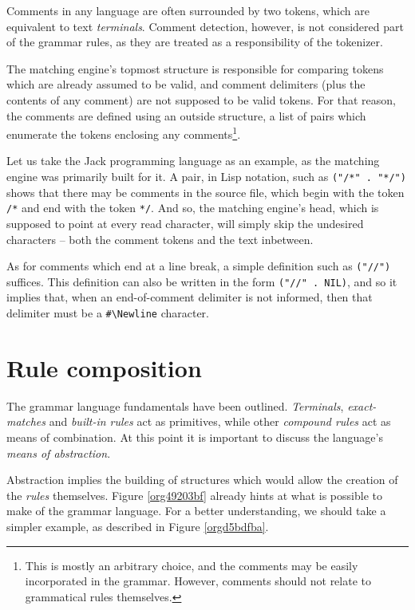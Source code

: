 \documentclass[a4paper,11pt,oneside]{article}
\begin{document}
Comments in any language are often surrounded by two tokens, which are
equivalent to text \emph{terminals}. Comment detection, however, is not
considered part of the grammar rules, as they are treated as a
responsibility of the tokenizer.

The matching engine's topmost structure is responsible for comparing
tokens which are already assumed to be valid, and comment delimiters
(plus the contents of any comment) are not supposed to be valid
tokens. For that reason, the comments are defined using an outside
structure, a list of pairs which enumerate the tokens enclosing any
comments\footnote{This is mostly an arbitrary choice, and the comments may be
easily incorporated in the grammar. However, comments should not
relate to grammatical rules themselves.}.

Let us take the Jack programming language as an example, as the
matching engine was primarily built for it. A pair, in Lisp notation,
such as \texttt{("/*" . "*/")} shows that there may be comments in the source
file, which begin with the token \texttt{/*} and end with the token \texttt{*/}. And
so, the matching engine's head, which is supposed to point at every
read character, will simply skip the undesired characters -- both the
comment tokens and the text inbetween.

As for comments which end at a line break, a simple definition such as
\texttt{("//")} suffices. This definition can also be written in the form
\texttt{("//" . NIL)}, and so it implies that, when an end-of-comment delimiter
is not informed, then that delimiter must be a \texttt{\#\textbackslash{}Newline} character.

\section{Rule composition}
\label{sec:orga1ac63d}

The grammar language fundamentals have been outlined. \emph{Terminals},
\emph{exact-matches} and \emph{built-in rules} act as primitives, while other
\emph{compound rules} act as means of combination. At this point it is
important to discuss the language's \emph{means of abstraction}.

Abstraction implies the building of structures which would allow the
creation of the \emph{rules} themselves. Figure \ref{org49203bf} already hints
at what is possible to make of the grammar language. For a better
understanding, we should take a simpler example, as described in
Figure \ref{orgd5bdfba}.
\end{document}
